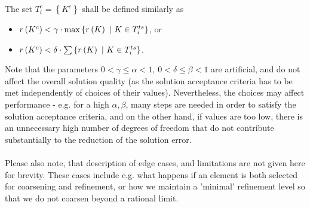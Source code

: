 The set $T^{c}_i = \left\{K^{c}\right\}$ shall be defined similarly as
\begin{itemize}
	\item $r\left( K^{c}\right) < \gamma \cdot \max\left\{r\left( K\right)\ |\ K \in T^{ts}_i\right\}$, or
	\item $r\left( K^{c}\right) < \delta \cdot \sum\left\{r\left( K\right)\ |\ K \in T^{ts}_i\right\}$.
\end{itemize}

Note that the parameters $0 < \gamma \leq \alpha < 1,\ 0 < \delta \leq \beta < 1$ are artificial, and do not affect the overall solution quality (as the solution acceptance criteria has to be met independently of choices of their values). Nevertheless, the choices may affect performance - e.g. for a high $\alpha, \beta$, many steps are needed in order to satisfy the solution acceptance criteria, and on the other hand, if values are too low, there is an unnecessary high number of degrees of freedom that do not contribute substantially to the reduction of the solution error.
\paragraph{}
Please also note, that description of edge cases, and limitations are not given here for brevity. These cases include e.g. what happens if an element is both selected for coarsening and refinement, or how we maintain a 'minimal' refinement level so that we do not coarsen beyond a rational limit.
